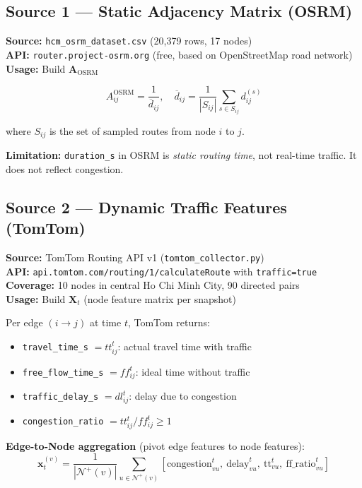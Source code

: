 \documentclass[12pt,a4paper]{article}
\begin{document}
\subsection{Source 1 — Static Adjacency Matrix (OSRM)}

\textbf{Source:} \texttt{hcm\_osrm\_dataset.csv} (20,379 rows, 17 nodes)\\
\textbf{API:} \texttt{router.project-osrm.org} (free, based on OpenStreetMap road network)\\
\textbf{Usage:} Build $\mathbf{A}_{\text{OSRM}}$

\begin{equation}
A_{ij}^{\text{OSRM}} = \frac{1}{\overline{d}_{ij}}, \quad
\overline{d}_{ij} = \frac{1}{|S_{ij}|} \sum_{s \in S_{ij}} d_{ij}^{(s)}
\end{equation}

where $S_{ij}$ is the set of sampled routes from node $i$ to $j$.

\textbf{Limitation:} \texttt{duration\_s} in OSRM is \textit{static routing time},
not real-time traffic. It does not reflect congestion.

\subsection{Source 2 — Dynamic Traffic Features (TomTom)}

\textbf{Source:} TomTom Routing API v1 (\texttt{tomtom\_collector.py})\\
\textbf{API:} \texttt{api.tomtom.com/routing/1/calculateRoute} with \texttt{traffic=true}\\
\textbf{Coverage:} 10 nodes in central Ho Chi Minh City, 90 directed pairs\\
\textbf{Usage:} Build $\mathbf{X}_t$ (node feature matrix per snapshot)

Per edge $(i \to j)$ at time $t$, TomTom returns:
\begin{itemize}
    \item \texttt{travel\_time\_s} $= tt_{ij}^t$: actual travel time with traffic
    \item \texttt{free\_flow\_time\_s} $= ff_{ij}^t$: ideal time without traffic
    \item \texttt{traffic\_delay\_s} $= dl_{ij}^t$: delay due to congestion
    \item \texttt{congestion\_ratio} $= tt_{ij}^t / ff_{ij}^t \geq 1$
\end{itemize}

\textbf{Edge-to-Node aggregation} (pivot edge features to node features):
\begin{equation}
\mathbf{x}_t^{(v)} = \frac{1}{|\mathcal{N}^+(v)|}
\sum_{u \in \mathcal{N}^+(v)}
\left[\text{congestion}_{vu}^t,\ \text{delay}_{vu}^t,\ \text{tt}_{vu}^t,\ \text{ff\_ratio}_{vu}^t \right]
\end{equation}
\end{document}
